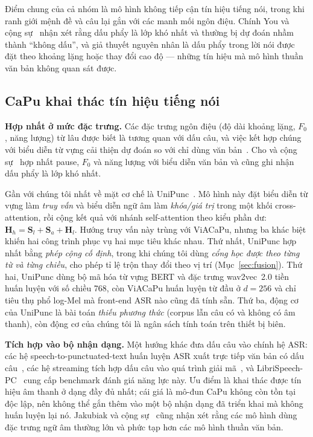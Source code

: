 \documentclass[conference,onecolumn]{IEEEtran}
\begin{document}
Điểm chung của cả nhóm là mô hình không tiếp cận tín hiệu tiếng nói, trong khi ranh
giới mệnh đề và câu lại gắn với các manh mối ngôn điệu. Chính You và cộng
sự~\cite{you2024lightweight} nhận xét rằng dấu phẩy là lớp khó nhất và thường bị dự
đoán nhầm thành ``không dấu'', và giả thuyết nguyên nhân là dấu phẩy trong lời nói
được đặt theo khoảng lặng hoặc thay đổi cao độ --- những tín hiệu mà mô hình thuần
văn bản không quan sát được.

\subsection{CaPu khai thác tín hiệu tiếng nói}
\textbf{Hợp nhất ở mức đặc trưng.} Các đặc trưng ngôn điệu (độ dài khoảng lặng,
$F_0$, năng lượng) từ lâu được biết là tương quan với dấu câu, và việc kết hợp
chúng với biểu diễn từ vựng cải thiện dự đoán so với chỉ dùng văn
bản~\cite{cho2022,che2020}. Cho và cộng sự~\cite{cho2022} hợp nhất pause, $F_0$ và
năng lượng với biểu diễn văn bản và cũng ghi nhận dấu phẩy là lớp khó nhất.

Gần với chúng tôi nhất về mặt cơ chế là UniPunc~\cite{unipunc}. Mô hình này đặt
biểu diễn từ vựng làm \emph{truy vấn} và biểu diễn ngữ âm làm \emph{khóa/giá trị}
trong một khối cross-attention, rồi cộng kết quả với nhánh self-attention theo kiểu
phần dư: $\mathbf{H}_h=\mathbf{S}_l+\mathbf{S}_a+\mathbf{H}_l$. Hướng truy vấn này
trùng với ViACaPu, nhưng ba khác biệt khiến hai công trình phục vụ hai mục tiêu
khác nhau. Thứ nhất, UniPunc hợp nhất bằng \emph{phép cộng cố định}, trong khi
chúng tôi dùng \emph{cổng học được theo từng từ và từng chiều}, cho phép tỉ lệ trộn
thay đổi theo vị trí (Mục~\ref{sec:fusion}). Thứ hai, UniPunc dùng bộ mã hóa từ
vựng BERT và đặc trưng wav2vec~2.0 tiền huấn luyện với số chiều 768, còn ViACaPu
huấn luyện từ đầu ở $d=256$ và chỉ tiêu thụ phổ log-Mel mà front-end ASR nào cũng
đã tính sẵn. Thứ ba, động cơ của UniPunc là bài toán \emph{thiếu phương thức}
(corpus lẫn câu có và không có âm thanh), còn động cơ của chúng tôi là ngân sách
tính toán trên thiết bị biên.

\textbf{Tích hợp vào bộ nhận dạng.} Một hướng khác đưa dấu câu vào chính hệ ASR:
các hệ speech-to-punctuated-text huấn luyện ASR xuất trực tiếp văn bản có dấu
câu~\cite{stpt}, các hệ streaming tích hợp dấu câu vào quá trình giải mã~\cite{kim2023},
và LibriSpeech-PC~\cite{librispeechpc} cung cấp benchmark đánh giá năng lực này.
Ưu điểm là khai thác được tín hiệu âm thanh ở dạng đầy đủ nhất; cái giá là mô-đun
CaPu không còn tồn tại độc lập, nên không thể gắn thêm vào một bộ nhận dạng đã
triển khai mà không huấn luyện lại nó. Jakubiak và cộng sự~\cite{stpt} cũng nhận
xét rằng các mô hình dùng đặc trưng ngữ âm thường lớn và phức tạp hơn các mô hình
thuần văn bản.
\end{document}
